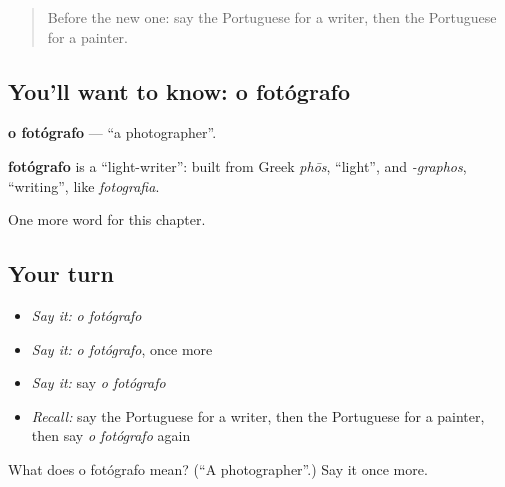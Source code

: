 \label{lesson:PT-C190-fotografo}



\begin{quote}
Before the new one: say the Portuguese for a writer, then the Portuguese for a painter.
\end{quote}

\subsection*{You'll want to know: o fotógrafo}
\textbf{o fotógrafo} — \textquotedblleft{}a photographer\textquotedblright{}.

\begin{cousinweb}
\textbf{fotógrafo} is a \textquotedblleft{}light-writer\textquotedblright{}: built from Greek \emph{phōs}, \textquotedblleft{}light\textquotedblright{}, and \emph{-graphos}, \textquotedblleft{}writing\textquotedblright{}, like \emph{fotografia}.
\end{cousinweb}

\begin{grammarlens}[title={What you've built}]
One more word for this chapter.
\end{grammarlens}

\subsection*{Your turn}
\begin{itemize}
\raggedright
  \item \emph{Say it:} \emph{o fotógrafo}
  \item \emph{Say it:} \emph{o fotógrafo}, once more
  \item \emph{Say it:} say \emph{o fotógrafo}
  \item \emph{Recall:} say the Portuguese for a writer, then the Portuguese for a painter, then say \emph{o fotógrafo} again
\end{itemize}

\begin{tcolorbox}[breakable,colback=teal!4,colframe=teal!35!black,title={Before you move on}]
What does o fotógrafo mean? (\textquotedblleft{}A photographer\textquotedblright{}.) Say it once more.
\end{tcolorbox}
